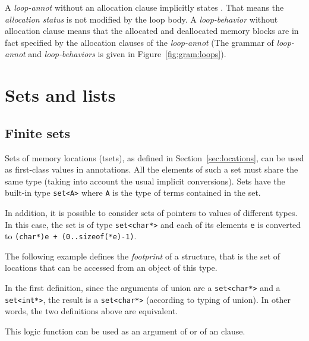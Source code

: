 A {\sl loop-annot} without an allocation clause implicitly states \Loop \allocates \nothing.
That means the {\sl allocation status} is not modified by the loop body.
A {\sl loop-behavior} without allocation clause means that  
the allocated and deallocated memory blocks are in fact specified by the allocation clauses
of the {\sl loop-annot}
(The grammar of {\sl loop-annot} and {\sl loop-behaviors} is given in Figure~\ref{fig:gram:loops}).

\section{Sets and lists}


\subsection{Finite sets}\label{sec:sets}
Sets of memory locations (tsets), as defined in Section~\ref{sec:locations},
can be used as first-class values in
annotations. All the elements of such a set must share the same type
(taking into account the usual implicit conversions).
Sets have the built-in type \lstinline|set<A>|
where \lstinline|A| is the type of terms contained in the set.

In addition, it is possible to consider sets of pointers to values of
different types. In this case, the set is of type
\lstinline|set<char*>| and
each of its elements \lstinline|e| is converted to
\lstinline|(char*)e + (0..sizeof(*e)-1)|.

\begin{example}
  The following example defines the \emph{footprint} of a
  structure, that is the set of locations that can be accessed from an
  object of this type.


  In the first definition, since the arguments of union are a
  \lstinline|set<char*>| and a \lstinline|set<int*>|,
  the result is a \lstinline|set<char*>| (according to typing of union). In
  other words, the two definitions above are equivalent.

  This logic function can be used as an argument of \separated or of an
  \assigns clause.
\end{example}

